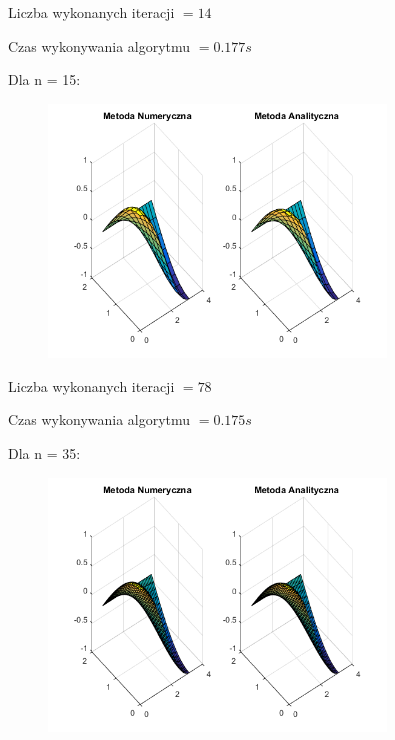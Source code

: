Liczba wykonanych iteracji $ = 14 $

Czas wykonywania algorytmu $ = 0.177 s$

Dla n = 15:

\begin{figure}[!ht]
	\begin{center}
		\includegraphics[width=0.8\textwidth]{Lab6/charts/gs/zad2/15.png}
	\end{center}
\end{figure}

Liczba wykonanych iteracji $ = 78 $

Czas wykonywania algorytmu $ = 0.175 s$

Dla n = 35:

\begin{figure}[!ht]
	\begin{center}
		\includegraphics[width=0.8\textwidth]{Lab6/charts/gs/zad2/35.png}
	\end{center}
\end{figure}

